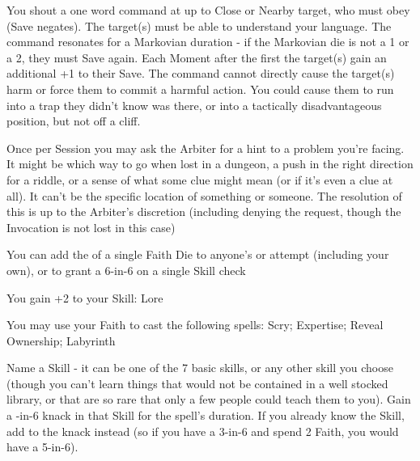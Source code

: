 {You shout a one word command at up to \DICE Close or Nearby target, who must obey (Save negates).  The target(s) must be able to understand your language.  The command resonates for a Markovian duration - if the Markovian die is not a 1 or a 2, they must Save again.  Each Moment after the first the target(s) gain an additional +1 to their Save.  The command cannot directly cause the target(s) harm or force them to commit a harmful action.  You could cause them to run into a trap they didn't know was there, or into a tactically disadvantageous position, but not off a cliff.


\GOD[
Name=The Muses,
Link=small-god-the muses,
GodOf=Gods of Inspiration,
Holy=a nine-pointed star worn as an amulet or inscribed on a headband
]


Once per Session you may ask the Arbiter for a hint to a problem you're facing. It might be which way to go when lost in a dungeon, a push in the right direction for a riddle, or a sense of what some clue might mean (or if it's even a clue at all). It can't be the specific location of something or someone. The resolution of this is  up to the Arbiter's discretion (including denying the request, though the Invocation is not lost in this case)


You can add the \SUMDICE of a single Faith Die to anyone's \RO or \RB attempt (including your own), or to grant a 6-in-6 on a single Skill check





\GOD[
Name=Thoth,
Link=small-god-thoth,
GodOf=God of Knowledge,
Holy=a small book of scripture
]


You gain +2 to your Skill: Lore


You may use your Faith to cast the following spells: Scry; Expertise; Reveal Ownership; Labyrinth

\LITURGY [
  Name= Expertise,
  Link= thoth-liturgy-expertise,
  Paradigm= Mind ,
  Save=  N ,
  Duration= \SUMDICE Minutes ,
  Counter=  n/a  ,
  Keywords= None ,
  Target=   Self
]



Name a Skill - it can be one of the 7 basic skills, or any other skill you choose (though you can't learn things that would not be contained in a well stocked library, or that are so rare that only a few people could teach them to you).  Gain a \DICE-in-6 {knack} in that Skill for the spell's duration.  If you already know the Skill, add \DICE to the {knack} instead (so if you have a 3-in-6 and spend 2 Faith, you would have a 5-in-6).

}
